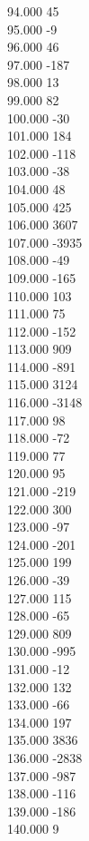 { 94.000	45 \\
 95.000	-9 \\
 96.000	46 \\
 97.000	-187 \\
 98.000	13 \\
 99.000	82 \\
 100.000	-30 \\
 101.000	184 \\
 102.000	-118 \\
 103.000	-38 \\
 104.000	48 \\
 105.000	425 \\
 106.000	3607 \\
 107.000	-3935 \\
 108.000	-49 \\
 109.000	-165 \\
 110.000	103 \\
 111.000	75 \\
 112.000	-152 \\
 113.000	909 \\
 114.000	-891 \\
 115.000	3124 \\
 116.000	-3148 \\
 117.000	98 \\
 118.000	-72 \\
 119.000	77 \\
 120.000	95 \\
 121.000	-219 \\
 122.000	300 \\
 123.000	-97 \\
 124.000	-201 \\
 125.000	199 \\
 126.000	-39 \\
 127.000	115 \\
 128.000	-65 \\
 129.000	809 \\
 130.000	-995 \\
 131.000	-12 \\
 132.000	132 \\
 133.000	-66 \\
 134.000	197 \\
 135.000	3836 \\
 136.000	-2838 \\
 137.000	-987 \\
 138.000	-116 \\
 139.000	-186 \\
 140.000	9 \\
}
